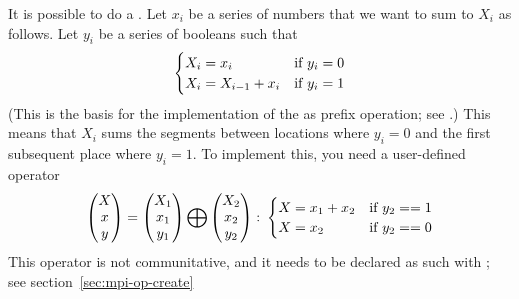 
It is possible to do a . Let $x_i$ be a series of numbers
that we want to sum to $X_i$ as follows. Let $y_i$ be a series of booleans such that
\[ 
\begin{cases}
  X_i=x_i&\hbox{if $y_i=0$}\\
  X_i=X_{i-1}+x_i&\hbox{if $y_i=1$}
\end{cases}
\]
(This is the basis for the implementation of the 
as prefix operation; see .)
This means that $X_i$ sums the segments between locations where $y_i=0$ and the
first subsequent place where $y_i=1$. To implement this, you need a user-defined operator
\[ 
\begin{pmatrix}  X\\ x\\ y\end{pmatrix}
=
\begin{pmatrix}  X_1\\ x_1\\ y_1\end{pmatrix}
\bigoplus
\begin{pmatrix}  X_2\\ x_2\\ y_2\end{pmatrix}\colon
  \begin{cases}
    X=x_1+x_2&\hbox{if $y_2==1$}\\ X=x_2&\hbox{if $y_2==0$}
  \end{cases}
\]
This operator is not communitative, and it needs to be declared as such
with ; see section~\ref{sec:mpi-op-create}


